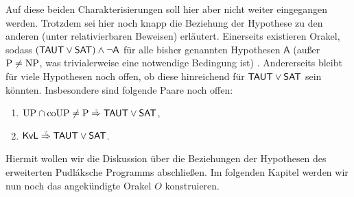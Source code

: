 \begin{itemize}[parsep=0pt,listparindent=\parindent,itemsep=5pt plus 1pt minus 1pt,midpenalty=0]
        Auf diese beiden Charakterisierungen soll hier aber nicht weiter eingegangen werden.
        Trotzdem sei hier noch knapp die Beziehung der Hypothese  zu den anderen (unter relativierbaren Beweisen) erläutert.
        Einerseits existieren Orakel, sodass $(\mathsf{TAUT}\lor\mathsf{SAT})\land \neg\mathsf{A}$ für alle bisher genannten Hypothesen $\mathsf A$ (außer $\mathrm{P}\neq\mathrm{NP}$, was trivialerweise eine notwendige Bedingung ist) . Andererseits bleibt für viele Hypothesen noch offen, ob diese hinreichend für $\mathsf{TAUT}\lor\mathsf{SAT}$ sein könnten. Insbesondere sind folgende Paare noch offen:
        \begin{enumerate}[noitemsep,resume,label=(\roman*)]
            \item $\UP\cap\coUP\neq \P\stackrel{\smash{\text{\raisebox{-1pt}{\tiny ?}}}}{\Rightarrow}\hTAUT\lor\hSAT$,
            \item $\mathsf{KvL}\stackrel{\smash{\text{\raisebox{-1pt}{\tiny ?}}}}{\Rightarrow}\hTAUT\lor\hSAT$.
        \end{enumerate}
\end{itemize}

Hiermit wollen wir die Diskussion über die Beziehungen der Hypothesen des erweiterten Pudláksche Programms abschließen. Im folgenden Kapitel werden wir nun noch das angekündigte Orakel $O$ konstruieren.

